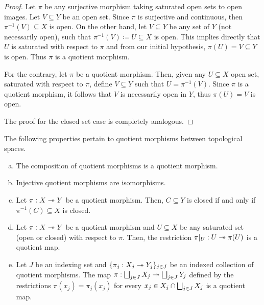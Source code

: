 \begin{proof}
Let \(\pi\) be any surjective morphism taking saturated open sets to open
images. Let \(V \subseteq Y\) be an open set. Since \(\pi\) is surjective and
continuous, then \(\pi^{-1}(V) \subseteq X\) is open. On the other hand, let \(V
\subseteq Y\) be any set of \(Y\) (not necessarily open), such that
\(\pi^{-1}(V) \coloneq U \subseteq X\) is open. This implies directly that \(U\)
is saturated with respect to \(\pi\) and from our initial hypothesis, \(\pi(U) =
V \subseteq Y\) is open. Thus \(\pi\) is a quotient morphism.

For the contrary, let \(\pi\) be a quotient morphism. Then, given any \(U
\subseteq X\) open set, saturated with respect to \(\pi\), define \(V \subseteq
Y\) such that \(U = \pi^{-1}(V)\). Since \(\pi\) is a quotient morphism, it
follows that \(V\) is necessarily open in \(Y\), thus \(\pi(U) = V\) is open.

The proof for the closed set case is completely analogous.
\end{proof}

\begin{proposition}
\label{prop:properties-quotient-morphism}
The following properties pertain to quotient morphisms between topological
spaces.
\begin{enumerate}[(a)]\setlength\itemsep{0em}
\item The composition of quotient morphisms is a quotient morphism.
\item Injective quotient morphisms are isomorphisms.
\item Let \(\pi: X \twoheadrightarrow Y\) be a quotient morphism. Then, \(C \subseteq Y\) is
  closed if and only if \(\pi^{-1}(C) \subseteq X\) is closed.
\item Let \(\pi: X \twoheadrightarrow Y\) be a quotient morphism and \(U \subseteq X\) be any
  saturated set (open or closed) with respect to \(\pi\). Then, the restriction
  \(\pi|_U: U \twoheadrightarrow \pi(U)\) is a quotient map.
\item Let \(J\) be an indexing set and \(\{\pi_j: X_j \twoheadrightarrow Y_j\}_{j \in J}\) be
  an indexed collection of quotient morphisms. The map \(\pi: \bigsqcup_{j \in J}
  X_j \twoheadrightarrow \bigsqcup_{j \in J} Y_j\) defined by the restrictions \(\pi(x_{j}) =
  \pi_{j}(x_j)\) for every \(x_j \in X_{j} \cap \bigsqcup_{j \in J} X_j\) is a
  quotient map.
\end{enumerate}
\end{proposition}


